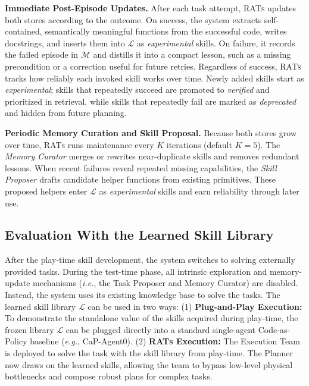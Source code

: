 \textbf{Immediate Post-Episode Updates.}
After each task attempt, \textsc{RATs} updates both stores according to the outcome.
On success, the system extracts self-contained, semantically meaningful functions from the successful code, writes docstrings, and inserts them into $\mathcal{L}$ as \emph{experimental} skills.
On failure, it records the failed episode in $\mathcal{M}$ and distills it into a compact lesson, such as a missing precondition or a correction useful for future retries.
Regardless of success, \textsc{RATs} tracks how reliably each invoked skill works over time. Newly added skills start as \emph{experimental}; skills that repeatedly succeed are promoted to \emph{verified} and prioritized in retrieval, while skills that repeatedly fail are marked as \emph{deprecated} and hidden from future planning.

\textbf{Periodic Memory Curation and Skill Proposal.}
Because both stores grow over time, \textsc{RATs} runs maintenance every $K$ iterations (default $K{=}5$). The \textit{Memory Curator} merges or rewrites near-duplicate skills and removes redundant lessons. When recent failures reveal repeated missing capabilities, the \textit{Skill Proposer} drafts candidate helper functions from existing primitives. These proposed helpers enter $\mathcal{L}$ as \emph{experimental} skills and earn reliability through later use.




\subsection{Evaluation With the Learned Skill Library}
\label{sec:test_time}
After the play-time skill development, the system switches to solving externally provided tasks. During the test-time phase, all intrinsic exploration and memory-update mechanisms (\textit{i.e.}, the Task Proposer and Memory Curator) are disabled.
Instead, the system uses its existing knowledge base to solve the tasks. The learned skill library $\mathcal{L}$ can be used in two ways:
(1) \textbf{Plug-and-Play Execution:} To demonstrate the standalone value of the skills acquired during play-time, the frozen library $\mathcal{L}$ can be plugged directly into a standard single-agent Code-as-Policy baseline (\textit{e.g.}, CaP-Agent0).
(2) \textbf{\textsc{RATs} Execution:} The Execution Team is deployed to solve the task with the skill library from play-time. The Planner now draws on the learned skills, allowing the team to bypass low-level physical bottlenecks and compose robust plans for complex tasks.



